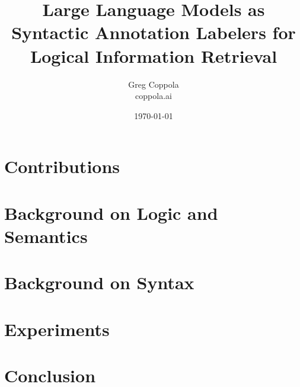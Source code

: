 \documentclass[11pt]{article}
\title{Large Language Models as Syntactic Annotation Labelers for Logical Information Retrieval}
\author{Greg Coppola\\coppola.ai}
\date{\today}
\begin{document}
\maketitle



\section{Contributions}


\section{Background on Logic and Semantics}


\section{Background on Syntax}


\section{Experiments}




\section{Conclusion}




\end{document}
